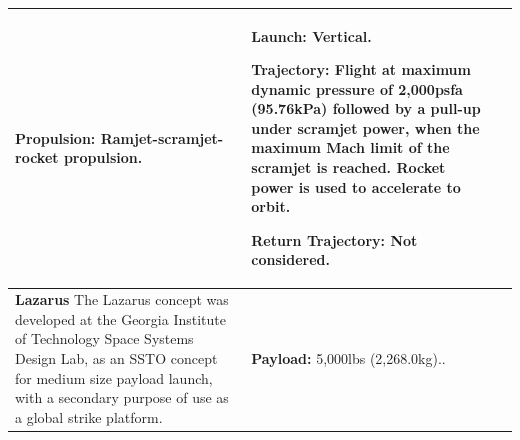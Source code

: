 {\begin{landscape}
\begin{xltabular}{\linewidth}{|X|X|X|}
			
			\textbf{Propulsion:} Ramjet-scramjet-rocket propulsion. 
			
			&
			\small {}
			
			\textbf{Launch:} Vertical. 
			
			\textbf{Trajectory:} Flight at maximum dynamic pressure of 2,000psfa (95.76kPa) followed by a pull-up under scramjet power, when the maximum Mach limit of the scramjet is reached. Rocket power is used to accelerate to orbit. 
			
			\textbf{Return Trajectory:} Not considered. 
			\\
			\hline \small\textbf{Lazarus}\cite{Young2006} \newline \newline 
			The Lazarus concept was developed at the Georgia Institute of Technology Space Systems Design Lab, as an SSTO concept for medium size payload launch, with a secondary purpose of use as a global strike platform. 
			
			&\small {}  
			
			\textbf{Payload:} 5,000lbs (2,268.0kg)..
			

\end{xltabular}
\end{landscape}}
